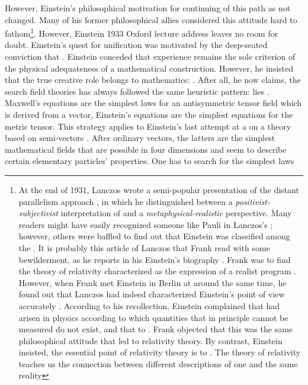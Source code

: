 \documentclass[draft]{article}
\begin{document}
However, Einstein's philosophical motivation for continuing of this path as not changed. Many of his former philosophical allies considered this attitude hard to fathom\footnote{At the end of 1931, Lanczos wrote a semi-popular presentation of the distant parallelism approach \citep{Lanczos1931}, in which he distinguished between a \emph{positivist-subjectivist} interpretation of \rt and a \emph{metaphysical-realistic} perspective. Many readers might have easily recognized someone like Pauli in Lanczos's ; however, others were baffled to find out that Einstein was classified among the . It is probably this article of Lanczos that Frank read with some bewilderment, as he reports in his Einstein's biography \citep{Frank1947}. Frank was  to find the theory of relativity characterized as the expression of a realist program  \citep[215]{Frank1947}. However, when Frank met Einstein in Berlin at around the same time, he found out that Lanczos had indeed characterized Einstein's point of view accurately \citep[215f.]{Frank1947}. According to his recollection, Einstein complained that  had arisen in physics according to which quantities that in principle cannot be measured do not exist, and that to  \citep[216]{Frank1947}. Frank objected that this was the same philosophical attitude that led to relativity theory. By contrast, Einstein insisted, the essential point of relativity theory is to   \citep[216]{Frank1947}. The theory of relativity teaches us the connection between different descriptions of one and the same reality}. However, Einstein 1933 Oxford lecture address leaves no room for doubt. Einstein's quest for unification was motivated by the deep-seated conviction that  \citep{Einstein1933}. Einstein conceded that experience remains the sole criterion of the physical adequateness of a mathematical construction. However, he insisted that the true creative role belongs to mathematics:  \citep[167]{Einstein1933}. After all, he now claims, the search field theories has always followed the same heuristic pattern:  lies  \citep[168]{Einstein1933}. Maxwell's equations are the simplest laws for an antisymmetric tensor field which is derived from a vector, Einstein's equations are the simplest equations for the metric tensor\etc. This strategy applies to Einstein's last attempt at a \uft on a theory based on semi-vectors \citep{Einstein1932c,Einstein1933c,Einstein1934b,Einstein1933d}. After ordinary vectors, the latters are the simplest mathematical fields that are possible in four dimensions and seem to describe certain elementary particles' properties. One has to search for the simplest laws 
\end{document}
